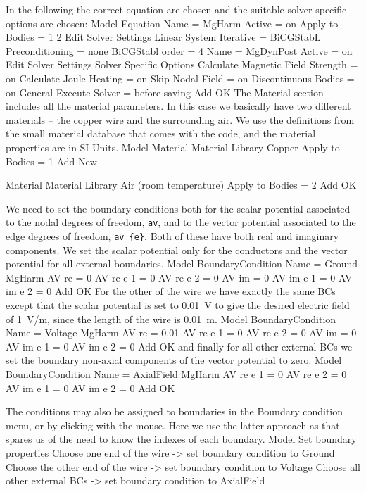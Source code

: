In the following the correct equation are chosen and the suitable solver specific options are chosen:
\ttbegin
Model
  Equation
    Name = MgHarm
      Active = on
      Apply to Bodies = 1 2  
      Edit Solver Settings
        Linear System
          Iterative = BiCGStabL
        Preconditioning = none
        BiCGStabl order = 4    
    Name = MgDynPost
      Active = on
      Edit Solver Settings
        Solver Specific Options
          Calculate Magnetic Field Strength = on
          Calculate Joule Heating = on
          Skip Nodal Field = on
          Discontinuous Bodies = on
        General
          Execute Solver = before saving   
    Add 
    OK
\ttend        
The Material section includes all the material parameters. In this case we basically have two 
different materials -- the copper wire and the surrounding air.
We use the definitions from the small material database that comes with the code, and the material properties are in SI Units.
\ttbegin
Model
  Material
    Material Library
      Copper
    Apply to Bodies = 1
    Add
    New

  Material
    Material Library
      Air (room temperature)
    Apply to Bodies = 2
    Add
    OK
\ttend

We need to set the boundary conditions both for the scalar potential associated to the nodal degrees of freedom, \texttt{av},
and to the vector potential associated to the edge degrees of freedom, \texttt{av \{e\}}.
Both of these have both real and imaginary components. 
We set the scalar potential only for the conductors and the vector potential for all external boundaries.
\ttbegin
Model
  BoundaryCondition
    Name = Ground 
    MgHarm
      AV re = 0
      AV re {e} 1 = 0
      AV re {e} 2 = 0
      AV im = 0
      AV im {e} 1 = 0
      AV im {e} 2 = 0
    Add
    OK
\ttend   
For the other of the wire we have exactly the same BCs except that the scalar potential is set to 0.01~V to give the desired
electric field of 1~V/m, since the length of the wire is 0.01~m. 
\ttbegin
Model
  BoundaryCondition
    Name = Voltage
    MgHarm
      AV re = 0.01
      AV re {e} 1 = 0
      AV re {e} 2 = 0
      AV im = 0
      AV im {e} 1 = 0
      AV im {e} 2 = 0
    Add
    OK
\ttend   
and finally for all other external BCs we set the boundary non-axial components of the vector potential to zero.
\ttbegin
Model
  BoundaryCondition
    Name = AxialField
    MgHarm
      AV re {e} 1 = 0
      AV re {e} 2 = 0
      AV im {e} 1 = 0
      AV im {e} 2 = 0
    Add
    OK
\ttend 


The conditions may also be assigned to boundaries in the Boundary condition menu, or 
by clicking with the mouse. Here we use the latter approach as that spares us of the 
need to know the indexes of each boundary.
\ttbegin
Model
  Set boundary properties
    Choose one end of the wire -> set boundary condition to Ground
    Choose the other end of the wire -> set boundary condition to Voltage
    Choose all other external BCs -> set boundary condition to AxialField
\ttend

